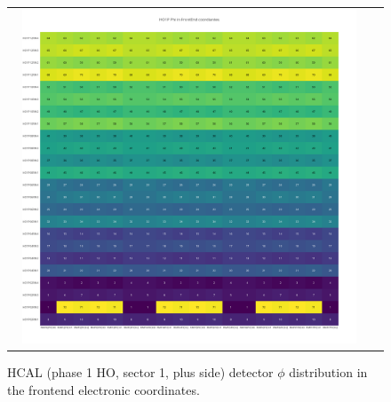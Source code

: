 \begin{figure}[htb]
 \begin{center}
  \begin{tabular}{cc}
   \includegraphics[angle=0,width=0.95\textwidth]{figures/appendix/HO1P_Phi_in_FrontEnd.png}
  \end{tabular}
  \caption{HCAL (phase 1 HO, sector 1, plus side) detector $\phi$ distribution in the frontend electronic coordinates.}
  \label{fig:lmapHO1PPhiFEC}
 \end{center}
\end{figure}
\clearpage

